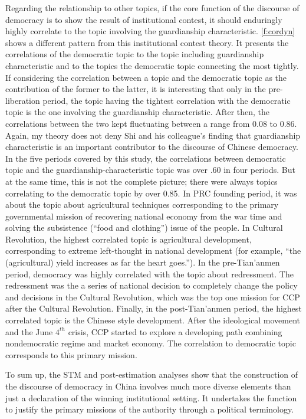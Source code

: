 \documentclass[abstracton,UTF8]{ctexart}
\begin{document}
Regarding the relationship to other topics, if the core function of the discourse of democracy is to show the result of institutional contest, it should enduringly highly correlate to the topic involving the guardianship characteristic. \cref{f:cordyn} shows a different pattern from this institutional contest theory. It presents the correlations of the democratic topic to the topic including guardianship characteristic and to the topics the democratic topic connecting the most tightly. If considering the correlation between a topic and the democratic topic as the contribution of the former to the latter, it is interesting that only in the pre-liberation period, the topic having the tightest correlation with the democratic topic is the one involving the guardianship characteristic. After then, the correlations between the two kept fluctuating between a range from 0.08 to 0.86. Again, my theory does not deny Shi and his colleague's finding that guardianship characteristic is an important contributor to the discourse of Chinese democracy. In the five periods covered by this study, the correlations between democratic topic and the guardianship-characteristic topic was over .60 in four periods. But at the same time, this is not the complete picture; there were always topics correlating to the democratic topic by over 0.85. In PRC founding period, it was about the topic about agricultural techniques corresponding to the primary governmental mission of recovering national economy from the war time and solving the subsistence (``food and clothing'') issue of the people. In Cultural Revolution, the highest correlated topic is agricultural development, corresponding to extreme left-thought in national development (for example, ``the (agricultural) yield increases as far the heart goes.''). In the pre-Tian'anmen period, democracy was highly correlated with the topic about redressment. The redressment was the a series of national decision to completely change the policy and decisions in the Cultural Revolution, which was the top one mission for CCP after the Cultural Revolution. Finally, in the post-Tian'anmen period, the highest correlated topic is the Chinese style development. After the ideological movement and the June $4^{th}$ crisis, CCP started to explore a developing path combining nondemocratic regime and market economy. The correlation to democratic topic corresponds to this primary mission. 

To sum up, the STM and post-estimation analyses show that the construction of the discourse of democracy in China involves much more diverse elements than just a declaration of the winning institutional setting. It undertakes the function to justify the primary missions of the authority through a political terminology. 
\end{document}
